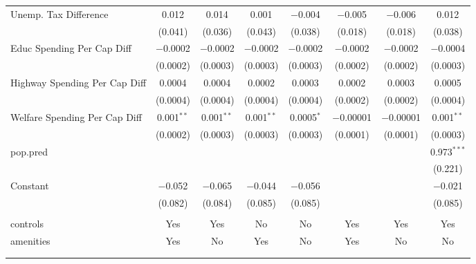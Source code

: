 \begin{table}[!htbp]
\begin{tabular}{@{\extracolsep{5pt}}lccccccc}
  Unemp. Tax Difference & 0.012 & 0.014 & 0.001 & $-$0.004 & $-$0.005 & $-$0.006 & 0.012 \\ 
  & (0.041) & (0.036) & (0.043) & (0.038) & (0.018) & (0.018) & (0.038) \\ 
  Educ Spending Per Cap Diff & $-$0.0002 & $-$0.0002 & $-$0.0002 & $-$0.0002 & $-$0.0002 & $-$0.0002 & $-$0.0004 \\ 
  & (0.0002) & (0.0003) & (0.0003) & (0.0003) & (0.0002) & (0.0002) & (0.0003) \\ 
  Highway Spending Per Cap Diff & 0.0004 & 0.0004 & 0.0002 & 0.0003 & 0.0002 & 0.0003 & 0.0005 \\ 
  & (0.0004) & (0.0004) & (0.0004) & (0.0004) & (0.0002) & (0.0002) & (0.0004) \\ 
  Welfare Spending Per Cap Diff & 0.001$^{**}$ & 0.001$^{**}$ & 0.001$^{**}$ & 0.0005$^{*}$ & $-$0.00001 & $-$0.00001 & 0.001$^{**}$ \\ 
  & (0.0002) & (0.0003) & (0.0003) & (0.0003) & (0.0001) & (0.0001) & (0.0003) \\ 
  pop.pred &  &  &  &  &  &  & 0.973$^{***}$ \\ 
  &  &  &  &  &  &  & (0.221) \\ 
  Constant & $-$0.052 & $-$0.065 & $-$0.044 & $-$0.056 &  &  & $-$0.021 \\ 
  & (0.082) & (0.084) & (0.085) & (0.085) &  &  & (0.085) \\ 
 \hline \\[-1.8ex] 
controls & Yes & Yes & No & No & Yes & Yes & Yes \\ 
amenities & Yes & No & Yes & No & Yes & No & No \\ 
\hline \\[-1.8ex] 
\hline 
\hline \\[-1.8ex] 
\end{tabular} 
\end{table} 
